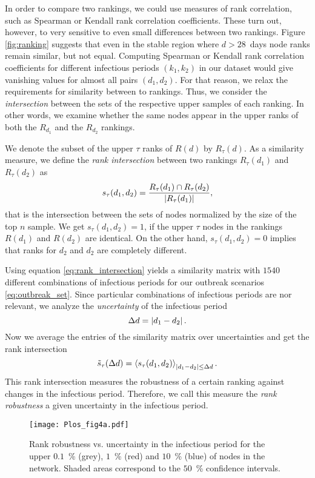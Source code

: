 In order to compare two rankings, we could use measures of rank correlation, such as Spearman or Kendall rank correlation coefficients.
These turn out, however, to very sensitive to even small differences between two rankings.
Figure \ref{fig:ranking} suggests that even in the stable region where $d>28$~days node ranks remain similar, but not equal.
Computing Spearman or Kendall rank correlation coefficients for different infectious periods $(k_1,k_2)$ in our dataset would give vanishing values for almost all pairs $(d_1,d_2)$.
For that reason, we relax the requirements for similarity between to rankings.
Thus, we consider the \emph{intersection} between the sets of the respective upper samples of each ranking.
In other words, we examine whether the same nodes appear in the upper ranks of both the $R_{d_1}$ and the $R_{d_2}$ rankings.

We denote the subset of the upper $\tau $ ranks of $R(d)$ by $R_\tau (d)$.
As a similarity measure, we define the \emph{rank intersection} between two rankings $R_\tau (d_1)$ and $R_\tau (d_2)$ as
\begin{equation}\label{eq:rank_intersection}
s_\tau (d_1,d_2)=\frac{R_\tau (d_1) \cap R_\tau (d_2)}{\left| R_\tau (d_1) \right|},
\end{equation}
that is the intersection between the sets of nodes normalized by the size of the top $n$ sample.
We get $s_\tau (d_1,d_2) =1$, if the upper $\tau $ nodes in the rankings $R(d_1)$ and $R(d_2)$ are identical.
On the other hand, $s_\tau (d_1,d_2) =0$ implies that ranks for $d_2$ and $d_2$ are completely different.

Using equation \eqref{eq:rank_intersection} yields a similarity matrix with $1540$ different combinations of infectious periods for our outbreak scenarios \eqref{eq:outbreak_set}.
Since particular combinations of infectious periods are nor relevant, we analyze the \emph{uncertainty} of the infectious period
\begin{equation}\label{eq:uncertainty_k}
\Delta d= \left| d_1-d_2 \right| .
\end{equation}
Now we average the entries of the similarity matrix over uncertainties and get the rank intersection
\begin{equation}\label{eq:robustness_k}
\tilde{s}_\tau (\Delta d)=\left< s_\tau (d_1,d_2) \right>_{\left| d_1-d_2 \right|\leq \Delta d} .
\end{equation}
This rank intersection measures the robustness of a certain ranking against changes in the infectious period.
Therefore, we call this measure the \emph{rank robustness} a given uncertainty in the infectious period.
%
\begin{SCfigure}
\texttt{[image: Plos\_fig4a.pdf]}
\caption{Rank robustness vs. uncertainty in the infectious period for the upper $0.1$~\% (grey), $1$~\% (red) and $10$~\% (blue) of nodes in the network.
Shaded areas correspond to the $50$~\% confidence intervals.}
\label{fig:plos_fig4a}
\end{SCfigure}

